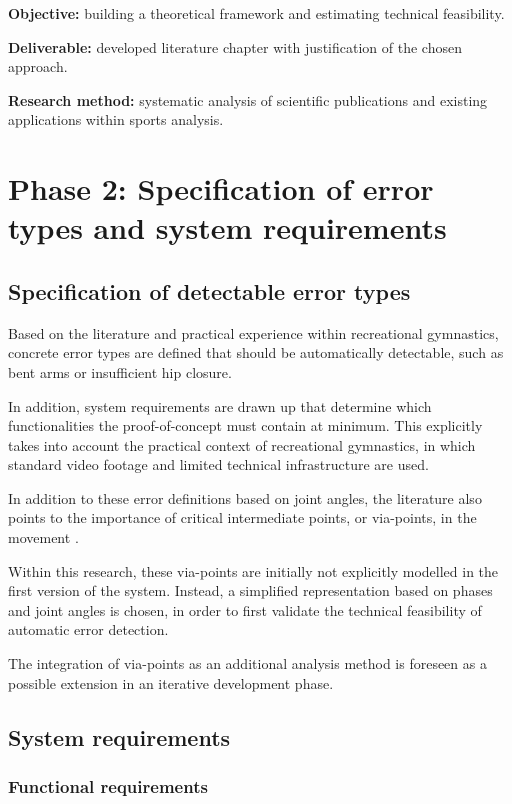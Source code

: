 \textbf{Objective:} building a theoretical framework and estimating technical feasibility.  

\textbf{Deliverable:} developed literature chapter with justification of the chosen approach.  

\textbf{Research method:} systematic analysis of scientific publications and existing applications within sports analysis.

\section{Phase 2: Specification of error types and system requirements}

\subsection{Specification of detectable error types}

Based on the literature and practical experience within recreational gymnastics, concrete error types are defined that should be automatically detectable, such as bent arms or insufficient hip closure.

In addition, system requirements are drawn up that determine which functionalities the proof-of-concept must contain at minimum. This explicitly takes into account the practical context of recreational gymnastics, in which standard video footage and limited technical infrastructure are used.

In addition to these error definitions based on joint angles, the literature also points to the importance of critical intermediate points, or via-points, in the movement \autocite{Yamasaki2010}.

Within this research, these via-points are initially not explicitly modelled in the first version of the system. Instead, a simplified representation based on phases and joint angles is chosen, in order to first validate the technical feasibility of automatic error detection.

The integration of via-points as an additional analysis method is foreseen as a possible extension in an iterative development phase.

\subsection{System requirements}
\subsubsection{Functional requirements}

